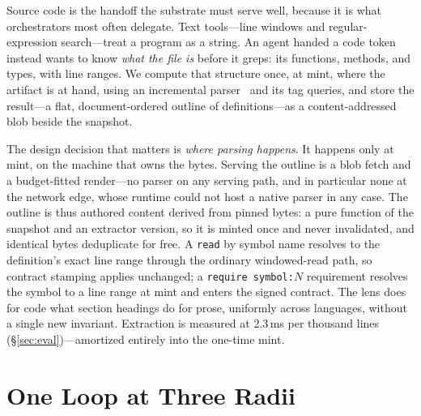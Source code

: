 \documentclass[10pt,twocolumn]{article}
\newcommand{\tok}[1]{\texttt{#1}}
\begin{document}
Source code is the handoff the substrate must serve well, because it is
what orchestrators most often delegate. Text tools---line windows and
regular-expression search---treat a program as a string. An agent handed a
code token instead wants to know \emph{what the file is} before it greps:
its functions, methods, and types, with line ranges. We compute that
structure once, at mint, where the artifact is at hand, using an
incremental parser~\citep{treesitter} and its tag queries, and store the
result---a flat, document-ordered outline of definitions---as a
content-addressed blob beside the snapshot.

The design decision that matters is \emph{where parsing happens}. It
happens only at mint, on the machine that owns the bytes. Serving the
outline is a blob fetch and a budget-fitted render---no parser on any
serving path, and in particular none at the network edge, whose runtime
could not host a native parser in any case. The outline is thus authored
content derived from pinned bytes: a pure function of the snapshot and an
extractor version, so it is minted once and never invalidated, and
identical bytes deduplicate for free. A \tok{read} by symbol name resolves
to the definition's exact line range through the ordinary windowed-read
path, so contract stamping applies unchanged; a \tok{require symbol:$N$}
requirement resolves the symbol to a line range at mint and enters the
signed contract. The lens does for code what section headings do for
prose, uniformly across languages, without a single new invariant.
Extraction is measured at 2.3\,ms per thousand lines
(\S\ref{sec:eval})---amortized entirely into the one-time mint.

\section{One Loop at Three Radii}
\label{sec:radii}
\end{document}
